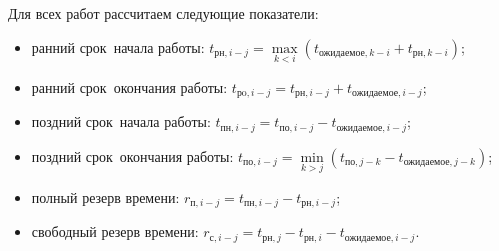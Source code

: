 Для всех работ рассчитаем следующие показатели:

\begin{itemize}
	\item  ранний срок~начала работы:
		$
			t_{\text{рн}, i - j}  = \max\limits_ {k< i} \left(  t_{\text{ожидаемое}, k - i}  + t_{\text{рн}, k - i} \right)
		$;
	\item ранний срок~окончания работы:
		$
			t_{\text{рo}, i - j}	 = t_{\text{рн}, i - j} + t_{\text{ожидаемое}, i - j} 
		$;
	\item  поздний срок~начала работы: 
		$
			t_{\text{пн}, i - j}	 = t_{\text{по}, i - j} - t_{\text{ожидаемое}, i - j} 
		$;
	\item  поздний срок~окончания работы:
		$
			t_{\text{по}, i - j}  = \min\limits_ {k> j}  \left( t_{\text{по}, j - k} - t_{\text{ожидаемое}, j - k}  \right)
		$;
	\item  полный резерв времени:
		$
			r_{\text{п}, i - j} =t_{\text{пн}, i - j}	 - t_{\text{рн}, i - j}
		$;
	\item  свободный резерв времени: 
		$
			r_{\text{с}, i - j} = t_{\text{рн}, j} - t_{\text{рн}, i} - t_{\text{ожидаемое}, i - j} 
		$.
\end{itemize}

